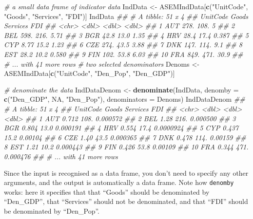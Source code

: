 \documentclass[
]{book}
\newenvironment{Shaded}{\begin{snugshade}}{\end{snugshade}}
\newcommand{\CommentTok}[1]{\textcolor[rgb]{0.56,0.35,0.01}{\textit{#1}}}
\newcommand{\DataTypeTok}[1]{\textcolor[rgb]{0.13,0.29,0.53}{#1}}
\newcommand{\KeywordTok}[1]{\textcolor[rgb]{0.13,0.29,0.53}{\textbf{#1}}}
\newcommand{\NormalTok}[1]{#1}
\newcommand{\OtherTok}[1]{\textcolor[rgb]{0.56,0.35,0.01}{#1}}
\newcommand{\StringTok}[1]{\textcolor[rgb]{0.31,0.60,0.02}{#1}}
\begin{document}
\begin{Shaded}
\begin{Highlighting}[]
\CommentTok{# a small data frame of indicator data}
\NormalTok{IndData <-}\StringTok{ }\NormalTok{ASEMIndData[}\KeywordTok{c}\NormalTok{(}\StringTok{"UnitCode"}\NormalTok{, }\StringTok{"Goods"}\NormalTok{, }\StringTok{"Services"}\NormalTok{, }\StringTok{"FDI"}\NormalTok{)]}
\NormalTok{IndData}
\CommentTok{## # A tibble: 51 x 4}
\CommentTok{##    UnitCode  Goods Services    FDI}
\CommentTok{##    <chr>     <dbl>    <dbl>  <dbl>}
\CommentTok{##  1 AUT      278.      108.   5    }
\CommentTok{##  2 BEL      598.      216.   5.71 }
\CommentTok{##  3 BGR       42.8      13.0  1.35 }
\CommentTok{##  4 HRV       28.4      17.4  0.387}
\CommentTok{##  5 CYP        8.77     15.2  1.23 }
\CommentTok{##  6 CZE      274.       43.5  3.88 }
\CommentTok{##  7 DNK      147.      114.   9.1  }
\CommentTok{##  8 EST       28.2      10.2  0.580}
\CommentTok{##  9 FIN      102.       53.8  6.03 }
\CommentTok{## 10 FRA      849.      471.  30.9  }
\CommentTok{## # ... with 41 more rows}
\CommentTok{# two selected denominators}
\NormalTok{Denoms <-}\StringTok{ }\NormalTok{ASEMIndData[}\KeywordTok{c}\NormalTok{(}\StringTok{"UnitCode"}\NormalTok{, }\StringTok{"Den_Pop"}\NormalTok{, }\StringTok{"Den_GDP"}\NormalTok{)]}

\CommentTok{# denominate the data}
\NormalTok{IndDataDenom <-}\StringTok{ }\KeywordTok{denominate}\NormalTok{(IndData, }\DataTypeTok{denomby =} \KeywordTok{c}\NormalTok{(}\StringTok{"Den_GDP"}\NormalTok{, }\OtherTok{NA}\NormalTok{, }\StringTok{"Den_Pop"}\NormalTok{), }\DataTypeTok{denominators =}\NormalTok{ Denoms)}
\NormalTok{IndDataDenom}
\CommentTok{## # A tibble: 51 x 4}
\CommentTok{##    UnitCode Goods Services       FDI}
\CommentTok{##    <chr>    <dbl>    <dbl>     <dbl>}
\CommentTok{##  1 AUT      0.712    108.  0.000572 }
\CommentTok{##  2 BEL      1.28     216.  0.000500 }
\CommentTok{##  3 BGR      0.804     13.0 0.000191 }
\CommentTok{##  4 HRV      0.554     17.4 0.0000924}
\CommentTok{##  5 CYP      0.437     15.2 0.00104  }
\CommentTok{##  6 CZE      1.40      43.5 0.000365 }
\CommentTok{##  7 DNK      0.478    114.  0.00159  }
\CommentTok{##  8 EST      1.21      10.2 0.000443 }
\CommentTok{##  9 FIN      0.426     53.8 0.00109  }
\CommentTok{## 10 FRA      0.344    471.  0.000476 }
\CommentTok{## # ... with 41 more rows}
\end{Highlighting}
\end{Shaded}

Since the input is recognised as a data frame, you don't need to specify any other arguments, and the output is automatically a data frame. Note how \texttt{denomby} works: here it specifies that that ``Goods'' should be denominated by ``Den\_GDP'', that ``Services'' should not be denominated, and that ``FDI'' should be denominated by ``Den\_Pop''.
\end{document}
